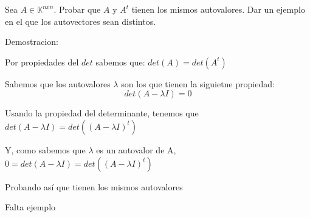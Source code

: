 \begin{enunciado}{\ejercicio}
Sea $A \in \mathbb{K}^{nxn}$. Probar que $A$ y $A^{t}$ tienen los mismos autovalores. Dar un ejemplo en el
 que los autovectores sean distintos.
\end{enunciado}

Demostracion:

Por propiedades del $det$ sabemos que: $det(A) = det(A^{t})$

Sabemos que los autovalores $\lambda$ son los que tienen la siguietne propiedad:
    $$det(A - \lambda I) = 0 $$


Usando la propiedad del determinante, tenemos que $det(A - \lambda I) = det((A - \lambda I)^{t})$

Y, como sabemos que $\lambda$ es un autovalor de A, $0 = det(A - \lambda I) = det((A - \lambda I)^{t})$

Probando así que tienen los mismos autovalores

Falta ejemplo{\hacer}
